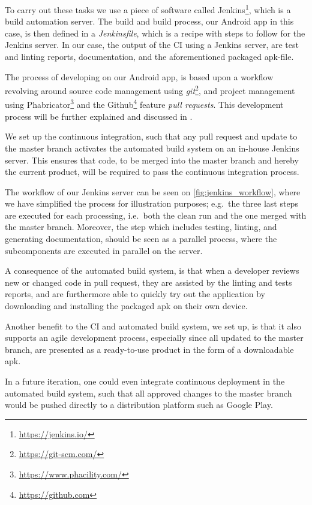 To carry out these tasks we use a piece of software called Jenkins\footnote{\url{https://jenkins.io/}}, which is a build automation server.
The build and build process, our Android app in this case, is then defined in a \textit{Jenkinsfile}, which is a recipe with steps to follow for the Jenkins server.
In our case, the output of the \acl{CI} using a Jenkins server, are test and linting reports, documentation, and the aforementioned packaged apk-file.

The process of developing on our Android app, is based upon a workflow revolving around source code management using \textit{git}\footnote{\url{https://git-scm.com/}}, and project management using Phabricator\footnote{\url{https://www.phacility.com/}} and the Github\footnote{\url{https://github.com}} feature \textit{pull requests}.
This development process will be further explained and discussed in .

We set up the continuous integration, such that any pull request and update to the master branch activates the automated build system on an in-house Jenkins server.
This ensures that code, to be merged into the master branch and hereby the current product, will be required to pass the continuous integration process.

The workflow of our Jenkins server can be seen on \cref{fig:jenkins_workflow}, where we have simplified the process for illustration purposes; e.g.~the three last steps are executed for each processing, i.e.~both the clean run and the one merged with the master branch.
Moreover, the step which includes testing, linting, and generating documentation, should be seen as a parallel process, where the subcomponents are executed in parallel on the server.



A consequence of the automated build system, is that when a developer reviews new or changed code in pull request, they are assisted by the linting and tests reports, and are furthermore able to quickly try out the application by downloading and installing the packaged apk on their own device.

\bigskip
Another benefit to the \acl{CI} and automated build system, we set up, is that it also supports an agile development process, especially since all updated to the master branch, are presented as a ready-to-use product in the form of a downloadable apk.

In a future iteration, one could even integrate continuous deployment in the automated build system, such that all approved changes to the master branch would be pushed directly to a distribution platform such as Google Play.

